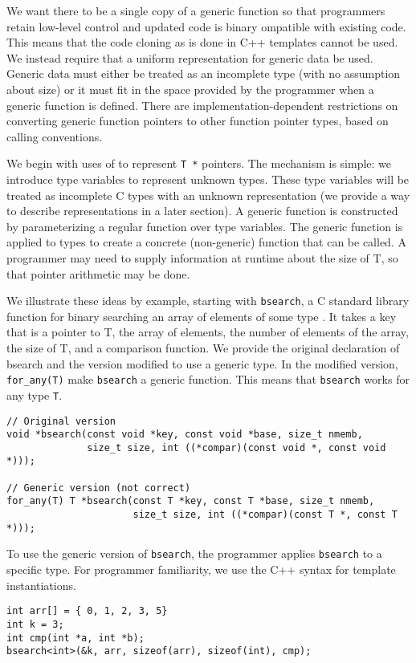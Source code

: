 We want there to be a single copy of a generic function so that programmers
retain low-level control and updated code is binary ompatible with existing code.  
This means that the code cloning as is done in C++ templates cannot be used.  
We instead require that a uniform representation for generic data be used.
Generic data must either be treated as an incomplete type (with no assumption
about size) or it must fit in the space provided by the programmer when
a generic function is defined. There are implementation-dependent restrictions 
on converting generic function pointers to  other function pointer types,
based on calling conventions.

We begin with uses of \uncheckedptrvoid{} to represent \lstinline+T *+ pointers.
The mechanism is simple: we introduce type variables to represent unknown types.
These type variables will be treated as incomplete C types with an unknown
representation (we provide a way to describe representations in a later
section).   A generic function is constructed by parameterizing a
regular function over type variables.  The generic function is applied
to types to create a concrete (non-generic) function that can be called.
A programmer may need to supply information at runtime about the size of T,
so that pointer arithmetic may be done.

We illustrate these ideas by example, starting with \lstinline+bsearch+, 
a C standard library function for binary
searching an array of elements of some type .  It
takes a key that is a pointer to T, the array of elements, the number of elements of
the array, the size of T, and a comparison function.  We provide the original declaration
of bsearch and the version modified to use a generic type.  In the modified version,
\lstinline+for_any(T)+ make \lstinline+bsearch+ a generic function.  This means that
\lstinline+bsearch+ works for any type \lstinline+T+.
\begin{lstlisting}
// Original version
void *bsearch(const void *key, const void *base, size_t nmemb, 
              size_t size, int ((*compar)(const void *, const void *)));

// Generic version (not correct)
for_any(T) T *bsearch(const T *key, const T *base, size_t nmemb,
                      size_t size, int ((*compar)(const T *, const T *)));
\end{lstlisting}
To use the generic version of \lstinline+bsearch+, the programmer applies \lstinline+bsearch+ to
a specific type.  For programmer familiarity, we use the C++ syntax for template
instantiations.
\begin{lstlisting}
int arr[] = { 0, 1, 2, 3, 5}
int k = 3;
int cmp(int *a, int *b);
bsearch<int>(&k, arr, sizeof(arr), sizeof(int), cmp);
\end{lstlisting}

